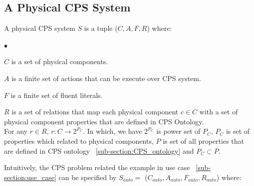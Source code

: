 \subsection{A Physical CPS System}
\label{for:physical_CPS_system}
\begin{definition}
\label{def:physical_CPS_system} 
A physical CPS system $S$ is a tuple ($C, A, F, R$) where:
%
\begin{list}{$\bullet$}{\itemsep=0pt \parsep=1pt \topsep=1pt \leftmargin=12pt} 
\item $C$ is a set of physical components.
\item $A$ is a finite set of actions that can be execute over CPS system.
\item $F$ is a finite set of fluent literals.
\item $R$ is a set of relations that map each physical component $c \in C$ with a set of physical component properties that are defined in CPS Ontology.  \\
For any $r \in R$, $r : C \longrightarrow 2^{P_{C}}$. In which, we have $2^{P_{C}}$ is power set of $P_{C}$, $P_{C}$ is set of properties which related to physical components, $P$ is set of all properties that are defined in CPS ontology ~\ref{sub-section:CPS_ontology} and $P_{C} \subset P$. 
\end{list}
%
\end{definition}
%
Intuitively, the CPS problem related the example in use case ~\ref{sub-section:use_case} can be specified by $S_{auto} = $ ($C_{auto}, A_{auto}, F_{auto}, R_{auto}$) where:
